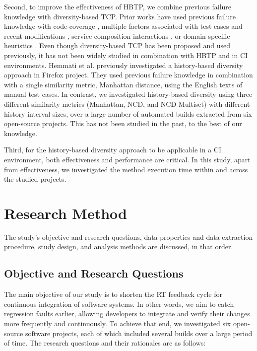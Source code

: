 \documentclass[1p]{elsarticle}
\begin{document}
Second, to improve the effectiveness of HBTP, we combine previous failure knowledge with diversity-based TCP. Prior works have used previous failure knowledge with code-coverage \cite{yoo2011faster,epitropakis2015empirical}, multiple factors associated with test cases and recent modifications \cite{strandberg2016experience}, service composition interactions \cite{srikanth2016test}, or domain-specific heuristics \cite{marijan2013test}. Even though diversity-based TCP has been proposed and used previously, it has not been widely studied in combination with HBTP and in CI environments. Hemmati et al. \cite{hemmati2017prioritizing} previously investigated a history-based diversity approach in Firefox project. They used previous failure knowledge in combination with a single similarity metric, Manhattan distance, using the English texts of manual test cases. In contrast, we investigated history-based diversity using three different similarity metrics (Manhattan, NCD, and NCD Multiset) with different history interval sizes, over a large number of automated builds extracted from six open-source projects. This has not been studied in the past, to the best of our knowledge. 

Third, for the history-based diversity approach to be applicable in a CI environment, both effectiveness and performance are critical. In this study, apart from effectiveness, we investigated the method execution time within and across the studied projects.  


 

\section{Research Method}
The study's objective and research questions, data properties and data extraction procedure, study design, and analysis methods are discussed, in that order.

\subsection{Objective and Research Questions}
The main objective of our study is to shorten the RT feedback cycle for continuous integration of software systems. In other words, we aim to catch regression faults earlier, allowing developers to integrate and verify their changes more frequently and continuously. To achieve that end, we investigated six open-source software projects, each of which included several builds over a large period of time. The research questions and their rationales are as follows:
\end{document}
